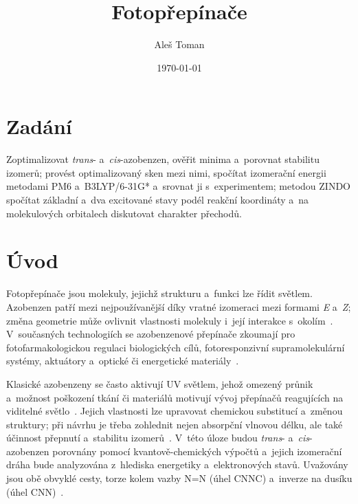 \documentclass[11pt,a4paper]{article}
\title{Fotopřepínače}
\author{Aleš Toman}
\date{\today}
\newcommand{\cis}{\textit{cis}}
\newcommand{\trans}{\textit{trans}}
\begin{document}
\maketitle
\renewcommand{\refname}{Zdroje}


\section*{Zadání}
Zoptimalizovat \trans\nobreakdash- a~\cis-azobenzen, ověřit minima a~porovnat stabilitu izomerů; provést
optimalizovaný sken mezi nimi, spočítat izomerační energii metodami PM6 a~\mbox{B3LYP/6-31G*} a~srovnat ji
s~experimentem; metodou ZINDO spočítat základní a~dva excitované stavy podél reakční koordináty a~na
molekulových orbitalech diskutovat charakter přechodů.

\section*{Úvod}
Fotopřepínače jsou molekuly, jejichž strukturu a~funkci lze řídit světlem. Azobenzen patří mezi
nejpoužívanější díky vratné izomeraci mezi formami \textit{E} a~\textit{Z}; změna geometrie může ovlivnit
vlastnosti molekuly i~její interakce s~okolím~\cite{Jiang2026,Gao2022}. V~současných technologiích se
azobenzenové přepínače zkoumají pro fotofarmakologickou regulaci biologických cílů, fotoresponzivní
supramolekulární systémy, aktuátory a~optické či energetické materiály~\cite{Jiang2026,Gao2022}.

Klasické azobenzeny se často aktivují UV světlem, jehož omezený průnik a~možnost poškození tkání či materiálů
motivují vývoj přepínačů reagujících na viditelné světlo~\cite{Gao2022,Li2025}. Jejich vlastnosti lze
upravovat chemickou substitucí a~změnou struktury; při návrhu je třeba zohlednit nejen absorpční vlnovou
délku, ale také účinnost přepnutí a~stabilitu izomerů~\cite{Li2025,Ryazantsev2021}. V~této úloze budou
\trans\nobreakdash- a~\cis-azobenzen porovnány pomocí kvantově-chemických výpočtů a~jejich izomerační dráha
bude analyzována z~hlediska energetiky a~elektronových stavů. Uvažovány jsou obě obvyklé cesty, torze kolem
vazby N=N (úhel CNNC) a~inverze na dusíku (úhel CNN)~\cite{Cembran2004}.
\end{document}
